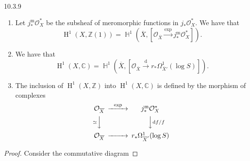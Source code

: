 \begin{construction}{10.3.9}
\begin{enumerate}
 \item[(i)]
      Let \(j_*^\mathrm {m}\mathcal {O}_X^*\) be the subsheaf of meromorphic functions in \(j_*\mathcal {O}_X^*\).
      We have that
      \[         \operatorname {H}^1(X,\mathbb {Z}(1))         = \operatorname {\mathbb {H}}^1(\overline {X},[\mathcal {O}_{\overline {X}}\xrightarrow {\exp }j_*^\mathrm {m}\mathcal {O}_X^*]).       \]
    


    
 \item[(ii)]
      We have that
      \[         \operatorname {H}^1(X,\mathbb {C})         = \operatorname {\mathbb {H}}^1(\overline {X},[\mathcal {O}_{\overline {X}}\xrightarrow {\mathrm {d}}r_*\Omega _{\overline {X}'}^1(\log  S)]).       \]
    


    
 \item[(iii)]
      The inclusion of \(\operatorname {H}^1(X,\mathbb {Z})\) into \(\operatorname {H}^1(X,\mathbb {C})\) is defined by the morphism of complexes
      \[         \begin {CD}           \mathcal {O}_{\overline {X}} @>{\exp }>> j_*^\mathrm {m}\mathcal {O}_X^*         \\@V{\simeq }VV @VV{\mathrm {d} f/f}V         \\\mathcal {O}_{\overline {X}} @>>> r_*\Omega _{\overline {X}'}^1(\log  S)         \end {CD}       \]
    

  \end{enumerate}\begin{proof}\par{}Consider the commutative diagram
      

\end{proof}
\end{construction}
